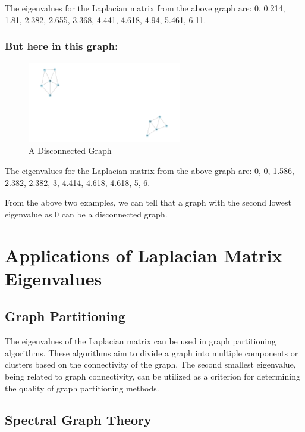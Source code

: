 \documentclass{article}
\begin{document}
The eigenvalues for the Laplacian matrix from the above graph are: 0, 0.214, 1.81, 2.382, 2.655, 3.368, 4.441, 4.618, 4.94, 5.461, 6.11.

\subsubsection{But here in this graph:}
\begin{figure}[h]
    \centering
    \includegraphics[width=0.6\textwidth]{discon.png}
    \caption{A Disconnected Graph}
    \label{fig:disConnectedGraph}
\end{figure}

The eigenvalues for the Laplacian matrix from the above graph are: 0, 0, 1.586, 2.382, 2.382, 3, 4.414, 4.618, 4.618, 5, 6.

From the above two examples, we can tell that a graph with the second lowest eigenvalue as 0 can be a disconnected graph.



\section{Applications of Laplacian Matrix Eigenvalues}

    \subsection{Graph Partitioning}
    
    The eigenvalues of the Laplacian matrix can be used in graph partitioning algorithms. These algorithms aim to divide a graph into multiple components or clusters based on the connectivity of the graph. The second smallest eigenvalue, being related to graph connectivity, can be utilized as a criterion for determining the quality of graph partitioning methods.
    
    \subsection{Spectral Graph Theory}
    
\end{document}

